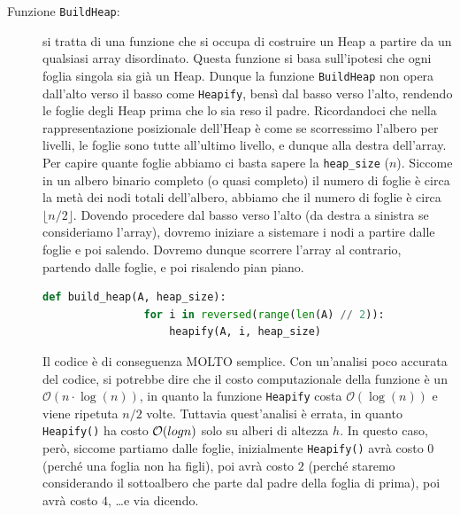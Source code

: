 \documentclass[12pt]{report}
\begin{document}
    \begin{description}
    	\item[Funzione \texttt{BuildHeap}:] si tratta di una funzione che si occupa di costruire un Heap a partire da un qualsiasi array disordinato. Questa funzione si basa sull'ipotesi che ogni foglia singola sia già un Heap. Dunque la funzione \texttt{BuildHeap} non opera dall'alto verso il basso come \texttt{Heapify}, bensì dal basso verso l'alto, rendendo le foglie degli Heap prima che lo sia reso il padre. Ricordandoci che nella rappresentazione posizionale dell'Heap è come se scorressimo l'albero per livelli, le foglie sono tutte all'ultimo livello, e dunque alla destra dell'array. Per capire quante foglie abbiamo ci basta sapere la \texttt{heap\_size} ($n$). Siccome in un albero binario completo (o quasi completo) il numero di foglie è circa la metà dei nodi totali dell'albero, abbiamo che il numero di foglie è circa $\lfloor n/2 \rfloor$. Dovendo procedere dal basso verso l'alto (da destra a sinistra se consideriamo l'array), dovremo iniziare a sistemare i nodi a partire dalle foglie e poi salendo. Dovremo dunque scorrere l'array al contrario, partendo dalle foglie, e poi risalendo pian piano.
    	
    	\begin{lstlisting}[language=Python, caption={Codice della funzione BuildHeap}]
    		def build_heap(A, heap_size):
    			for i in reversed(range(len(A) // 2)):
    				heapify(A, i, heap_size)
    	\end{lstlisting}
    
    	Il codice è di conseguenza MOLTO semplice.
    	Con un'analisi poco accurata del codice, si potrebbe dire che il costo computazionale della funzione è un $\mathcal{O}(n\cdot\log (n))$, in quanto la funzione \texttt{Heapify} costa $\mathcal{O}(\log(n))$ e viene ripetuta $n/2$ volte. Tuttavia quest'analisi è errata, in quanto \texttt{Heapify()} ha costo $\mathcal{O}(\\log n)$ solo su alberi di altezza $h$. In questo caso, però, siccome partiamo dalle foglie, inizialmente \texttt{Heapify()} avrà costo $0$ (perché una foglia non ha figli), poi avrà costo $2$ (perché staremo considerando il sottoalbero che parte dal padre della foglia di prima), poi avrà costo $4$, \dots e via dicendo. 
    	

\end{description}
\end{document}
